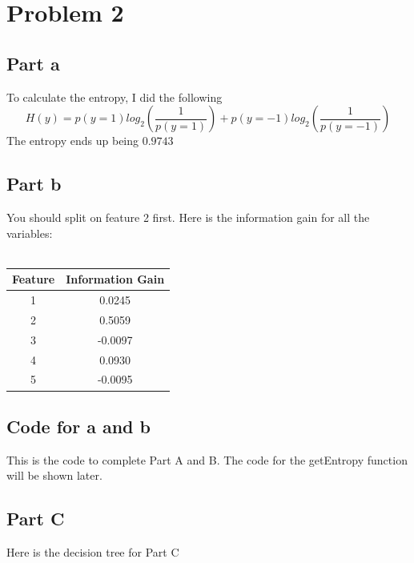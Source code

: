 \documentclass[twoside,11pt]{article}
\theoremstyle{definition}
\begin{document}
\newpage

\section*{Problem 2}

\subsection*{Part a}

To calculate the entropy, I did the following
\[
H(y) = p(y=1)log_2(\frac{1}{p(y=1)}) + p(y=-1)log_2(\frac{1}{p(y=-1)})
\]
The entropy ends up being $0.9743$
\\

\subsection*{Part b}

You should split on feature 2 first. Here is the information gain for all the variables:\\
\\
\begin{tabular}{ c | c }
  Feature & Information Gain\\
  \hline                       
  1 & 0.0245 \\
  2 & 0.5059 \\
  3 & -0.0097 \\
  4 & 0.0930 \\
  5 & -0.0095 \\      
\end{tabular}

\newpage

\subsection*{Code for a and b}

This is the code to complete Part A and B. The code for the getEntropy function will be shown later.



\subsection*{Part C}

Here is the decision tree for Part C
\end{document}
